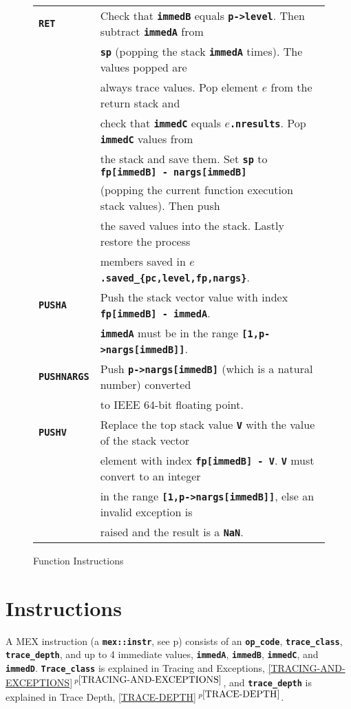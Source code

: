 \documentclass[12pt]{article}
\newcommand{\TT}[1]{{\tt \bfseries #1}}
\newcommand{\itemref}[1]{\ref{#1}$\,^{p\pageref{#1}}$}
\newcommand{\pagref}[1]{p\pageref{#1}}
\newcommand{\EOL}{\penalty \exhyphenpenalty}
\newlength{\figurewidth}
\newenvironment{boxedfigure}[1][!btp]%
	{\begin{figure*}[#1]
	 \begin{lrbox}{\figurebox}
	 \begin{minipage}{\figurewidth}

	 \vspace*{1ex}}%
	{
	 \vspace*{1ex}

	 \end{minipage}
	 \end{lrbox}

	 \centering
	 \fbox{\hspace*{0.1in}\usebox{\figurebox}\hspace*{0.1in}}
	 \end{figure*}}
\begin{document}
\begin{boxedfigure}
\begin{center}
\begin{tabular}{|l|l|}
\\\hline
\TT{RET}
    & Check that \TT{immedB} equals \TT{p->level}.  Then subtract
      \TT{immedA} from \\
    & \TT{sp} (popping the stack \TT{immedA} times).  The
      values popped are \\
    & always trace values.  Pop element $e$ from the
      return stack and \\
    & check that \TT{immedC} equals \TT{$e$.nresults}.  Pop \TT{immedC}
      values from \\
    & the stack and save them.  Set \TT{sp} to
      \TT{fp[immedB] - nargs[immedB]} \\
    & (popping the current function execution stack values).   Then push \\
    & the saved values into the stack.  Lastly restore the process \\
    & members saved in \TT{$e$.saved\_\{pc,level,fp,nargs\}}.
\\\hline
\TT{PUSHA}
    & Push the stack vector value with index \TT{fp[immedB] - immedA}. \\
    & \TT{immedA} must be 
      in the range \TT{[1,p->nargs[immedB]]}.
\\\hline
\TT{PUSHNARGS}
    & Push \TT{p->nargs[immedB]} (which is a natural number)
      converted \\
    & to IEEE 64-bit floating point.
\\\hline
\TT{PUSHV}
    & Replace the top stack value \TT{V} with the value of the stack vector \\
    & element with index \TT{fp[immedB] - V}.  \TT{V} must convert to an
      integer \\
    & in the range \TT{[1,p->nargs[immedB]]},
    else an invalid exception is \\
    & raised and the result is a \TT{NaN}.
\\\hline
\end{tabular}
\end{center}
\caption{Function Instructions}
\label{FUNCTION-INSTRUCTIONS}
\end{boxedfigure}

\clearpage

\section{Instructions}
\label{INSTRUCTIONS}

A MEX instruction (a \TT{mex::instr}, see \pagref{MEX::INSTR})
consists of an \TT{op\_code}, \TT{trace\_class}, \TT{trace\_\EOL depth},
and up to 4 immediate values,
\TT{immedA}, \TT{immedB}, \TT{immedC}, and \TT{immedD}.
\TT{Trace\_class} is explained in Tracing and Exceptions,
\itemref{TRACING-AND-EXCEPTIONS}, and
\TT{trace\_depth} is explained in Trace Depth,
\itemref{TRACE-DEPTH}.
\end{document}
